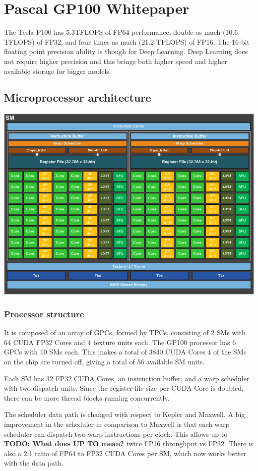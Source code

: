 
\section{Pascal GP100 Whitepaper}
The Tesla P100 has 5.3TFLOPS of FP64 performance, double as much (10.6 TFLOPS) of FP32, and four times as much (21.2 TFLOPS) of FP16.
The 16-bit floating point precision ability is though for Deep Learning.
Deep Learning does not require higher precision and this brings both higher speed and higher available storage for bigger models.

\subsection{Microprocessor architecture}
\includegraphics[width=0.9\linewidth]{gp100_sm}
\subsubsection{Processor structure}
It is composed of an array of GPCs, formed by TPCs, consisting of 2 SMs with 64 CUDA FP32 Cores and 4 texture units each.
The GP100 processor has 6 GPCs with 10 SMs each.
This makes a total of 3840 CUDA Cores
4 of the SMs on the chip are turned off, giving a total of 56 available SM units.

Each SM has 32 FP32 CUDA Cores, an instruction buffer, and a warp scheduler with two dispatch units.
Since the register file size per CUDA Core is doubled, there can be more thread blocks running concurrently.

The scheduler data path is changed with respect to Kepler and Maxwell.
A big improvement in the scheduler in comparison to Maxwell is that each warp scheduler can dispatch two warp instructions per clock.
This allows up to \textbf{TODO: What does UP TO mean?} twice FP16 throughput vs FP32.
There is also a 2:1 ratio of FP64 to FP32 CUDA Cores per SM, which now works better with the data path.
